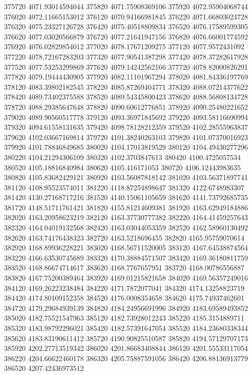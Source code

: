 {375720 4071.93014594044
375820 4071.75908369106
375920 4072.95904068744
376020 4072.11665153012
376120 4070.94166981845
376220 4071.66803024728
376320 4075.23327126728
376420 4075.40518809834
376520 4076.17589599305
376620 4077.03020566879
376720 4077.21641947156
376820 4076.66001774592
376920 4076.02829854012
377020 4078.17671209275
377120 4077.9572431092
377220 4078.72167283203
377320 4077.90541387298
377420 4078.37282617928
377520 4077.53253299869
377620 4079.14242562166
377720 4078.82000826291
377820 4079.19444430905
377920 4082.11101967294
378020 4081.84336197769
378120 4083.39802182545
378220 4085.87269404771
378320 4088.07214377622
378420 4089.73402375588
378520 4089.54345800423
378620 4088.56808134728
378720 4088.29385647648
378820 4090.60612776851
378920 4090.25480221652
379020 4089.90560517778
379120 4093.36971845692
379220 4093.58116690994
379320 4094.61558131635
379420 4098.78128212359
379520 4102.28555963837
379620 4102.03667169814
379720 4101.38240263103
379820 4101.07370016923
379920 4101.78846849685
380020 4104.17013819529
380120 4104.49430277296
380220 4104.21294306109
380320 4102.3703847613
380420 4100.4725057534
380520 4105.18816840984
380620 4105.416171053
380720 4106.12443983635
380820 4105.83682429121
380920 4103.56087818142
381020 4103.56371897741
381120 4108.95523574011
381220 4118.87254898647
381320 4122.6748983307
381420 4130.27168717216
381520 4140.15061105659
381620 4141.73792685735
381720 4148.51711761421
381820 4155.81214609381
381920 4163.62949184886
382020 4163.20958623219
382120 4163.37730777382
382220 4164.41459257643
382320 4164.04019132568
382420 4163.03044053359
382520 4162.58960130492
382620 4163.74176438323
382720 4163.5218696455
382820 4165.95759070614
382920 4168.89936228221
383020 4168.56711520005
383120 4167.64538874564
383220 4166.63530745689
383320 4170.38884571507
383420 4169.36180811759
383520 4168.86674714617
383620 4168.7767657951
383720 4168.00786556887
383820 4167.75200389464
383920 4169.01215821658
384020 4169.56357249016
384120 4169.26223238484
384220 4171.7872077041
384320 4174.13258823719
384420 4174.80109152358
384520 4176.0008354658
384620 4175.74937462601
384720 4179.29684939139
384820 4184.24956691996
384920 4183.69589493852
385020 4182.75521547963
385120 4182.73928012243
385220 4185.3154889711
385320 4183.98792296021
385420 4182.57391647054
385520 4184.23680338344
385620 4183.83190611412
385720 4190.90825510587
385820 4194.57129707173
385920 4202.27713519342
386020 4201.86683408844
386120 4201.55533117054
386220 4204.66622460178
386320 4205.75887591056
386420 4206.88136913779
386520 4207.42436973512
}

